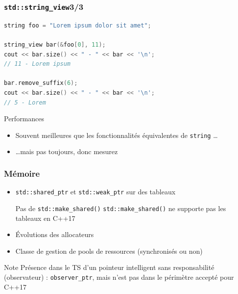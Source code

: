 \documentclass[C++.tex]{subfiles}
\begin{document}
\begin{frame}[fragile]
	\frametitle{\lstinline|std::string_view|\titlehfill{}3/3}
	\begin{lstlisting}[language=C++]
string foo = "Lorem ipsum dolor sit amet";

string_view bar(&foo[0], 11);
cout << bar.size() << " - " << bar << '\n';
// 11 - Lorem ipsum

bar.remove_suffix(6);
cout << bar.size() << " - " << bar << '\n';
// 5 - Lorem\end{lstlisting}

	\begin{exampleblock}{Performances}
		\begin{itemize}
			\item Souvent meilleures que les fonctionnalités équivalentes de \lstinline|string| \ldots
			\item \ldots mais pas toujours, donc mesurez
		\end{itemize} 

	\end{exampleblock}
\end{frame}

\begin{frame}[fragile]
	\frametitle{Mémoire}
	\begin{itemize}
		\item \lstinline|std::shared_ptr| et \lstinline|std::weak_ptr| sur des tableaux

\begin{alertblock}{Pas de \lstinline|std::make_shared()|}
	\lstinline|std::make_shared()| ne supporte pas les tableaux en C++17
\end{alertblock}

		\item Évolutions des allocateurs


		\item Classe de gestion de pools de ressources (synchronisés ou non)
	\end{itemize}

	\begin{block}{Note}
		Présence dans le TS d'un pointeur intelligent sans responsabilité (observateur) : \lstinline|observer_ptr|, mais n'est pas dans le périmètre accepté pour C++17
	\end{block}
\end{frame}
\end{document}
